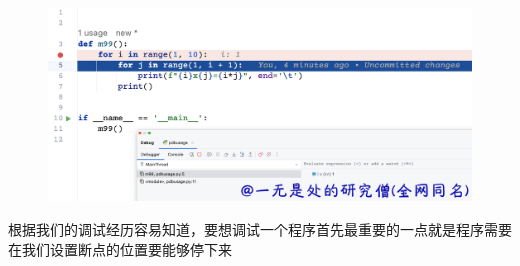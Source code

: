     \begin{figure}[H]
        \centering
            \includegraphics[scale=.25]{images/76-debugger.png}
						\caption{ }
        \label{fig:my_label}
    \end{figure}
    
根据我们的调试经历容易知道，要想调试一个程序首先最重要的一点就是程序需要在我们设置断点的位置要能够停下来
